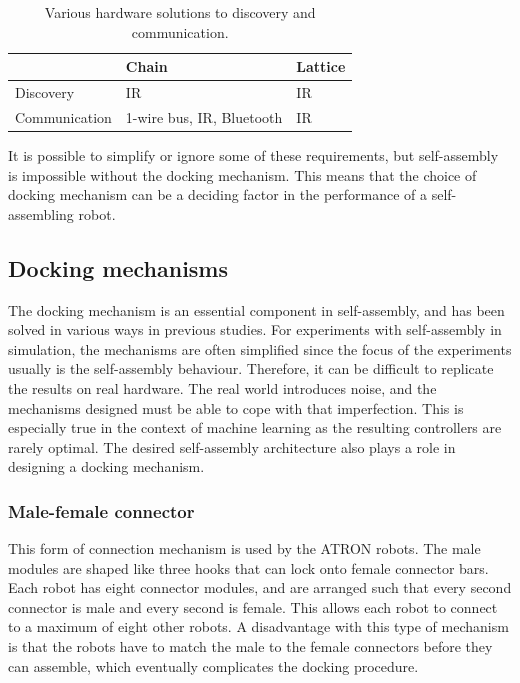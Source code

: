 \begin{table}[H]
	\centering
	\caption{Various hardware solutions to discovery and communication.}
	\begin{tabular}{ @{}  l  l  l  @{}}
		\toprule
		& Chain 						& Lattice \\
		\midrule
		Discovery 		& IR\cite{castano_conro:_2000}  & IR\cite{gilpin_miche:_2008} \\
		Communication 	& 1-wire bus\cite{zykov_molecubes:_2007}, IR\cite{castano_conro:_2000}, Bluetooth{\cite{mockel_yamor_2006}} & IR\cite{brandt_atron_2007, gilpin_miche:_2008}  \\ \bottomrule
	\end{tabular}
	
	\label{tab:hardware-mechanisms}
\end{table}	

It is possible to simplify or ignore some of these requirements, but self-assembly is impossible without the docking mechanism.
This means that the choice of docking mechanism can be a deciding factor in the performance of a self-assembling robot. 


\subsection{Docking mechanisms}
\label{sec:mechanisms}
The docking mechanism is an essential component in self-assembly, and has been solved in various ways in previous studies.
For experiments with self-assembly in simulation, the mechanisms are often simplified since the focus of the experiments usually is the self-assembly behaviour.
Therefore, it can be difficult to replicate the results on real hardware.
The real world introduces noise, and the mechanisms designed must be able to cope with that imperfection.
This is especially true in the context of machine learning as the resulting controllers are rarely optimal.
The desired self-assembly architecture also plays a role in designing a docking mechanism.

\subsubsection*{Male-female connector}
This form of connection mechanism is used by the ATRON\cite{brandt_atron_2007} robots.
The male modules are shaped like three hooks that can lock onto female connector bars.
Each robot has eight connector modules, and are arranged such that every second connector is male and every second is female.
This allows each robot to connect to a maximum of eight other robots.
A disadvantage with this type of mechanism is that the robots have to match the male to the female connectors before they can assemble, which eventually complicates the docking procedure.
